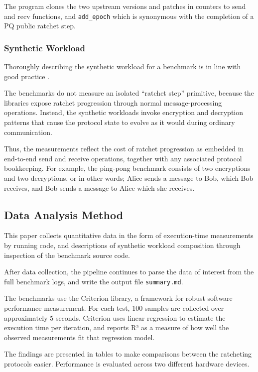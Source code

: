  The program clones the two upstream versions and patches in counters to send and recv functions, and \texttt{add\_epoch} which is synonymous with the completion of a PQ public ratchet step.

\subsubsection{Synthetic Workload}

Thoroughly describing the synthetic workload for a benchmark is in line with good practice \cite{ref22}.

The benchmarks do not measure an isolated ``ratchet step'' primitive, because the libraries expose ratchet progression through normal message-processing operations. Instead, the synthetic workloads invoke encryption and decryption patterns that cause the protocol state to evolve as it would during ordinary communication.

Thus, the measurements reflect the cost of ratchet progression as embedded in end-to-end send and receive operations, together with any associated protocol bookkeeping. For example, the ping-pong benchmark consists of two encryptions and two decryptions, or in other words; Alice sends a message to Bob, which Bob receives, and Bob sends a message to Alice which she receives.


\subsection{Data Analysis Method}

This paper collects quantitative data in the form of execution-time measurements by running code, and descriptions of synthetic workload composition through inspection of the benchmark source code.

After data collection, the pipeline continues to parse the data of interest from the full benchmark logs, and write the output file \texttt{summary.md}.

The benchmarks use the Criterion library, a framework for robust software performance measurement. For each test, 100 samples are collected over approximately 5 seconds. Criterion uses linear regression to estimate the execution time per iteration, and reports R² as a measure of how well the observed measurements fit that regression model.

The findings are presented in tables to make comparisons between the ratcheting protocols easier. Performance is evaluated across two different hardware devices. 

